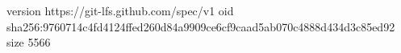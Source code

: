version https://git-lfs.github.com/spec/v1
oid sha256:9760714c4fd4124ffed260d84a9909ce6cf9caad5ab070c4888d434d3c85ed92
size 5566
